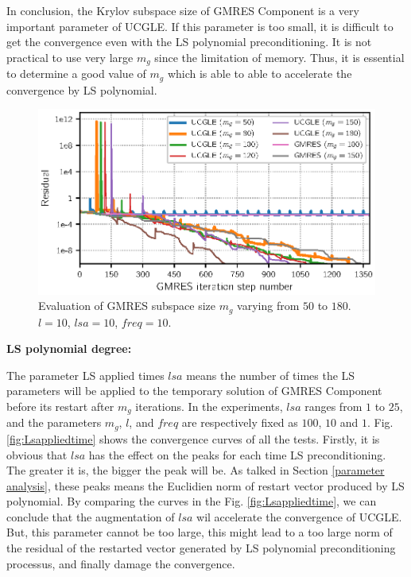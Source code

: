 In conclusion, the Krylov subspace size of GMRES Component is a very important parameter of UCGLE. If this parameter is too small, it is difficult to get the convergence even with the LS polynomial preconditioning. It is not practical to use very large $m_g$ since the limitation of memory. Thus, it is essential to determine a good value of $m_g$ which is able to able to accelerate the convergence by LS polynomial.

\begin{figure}[htbp]
	\centering
	\includegraphics[width=6.2in]{fig/conv_ksp_gmres.eps}
	\caption{Evaluation of GMRES subspace size $m_g$ varying from $50$ to $180$. $l=10$, $lsa=10$, $freq=10$.}
	\label{fig:krylovsubspace}
\end{figure}


\textbf{LS polynomial degree: }

The parameter LS applied times $lsa$ means the number of times the LS parameters will be applied to the temporary solution of GMRES Component before its restart after $m_g$ iterations. In the experiments, $lsa$ ranges from $1$ to $25$, and the parameters $m_g$, $l$, and $freq$ are respectively fixed as $100$, $10$ and $1$. Fig. \ref{fig:Lsappliedtime} shows the convergence curves of all the tests. Firstly, it is obvious that $lsa$ has the effect on the peaks for each time LS preconditioning. The greater it is, the bigger the peak will be. As talked in Section \ref{parameter analysis}, these peaks means the Euclidien norm of restart vector produced by LS polynomial. By comparing the curves in  the Fig. \ref{fig:Lsappliedtime}, we can conclude that the augmentation of $lsa$ wil accelerate the convergence of UCGLE. But, this parameter cannot be too large, this might lead to a too large norm of the residual of the restarted vector generated by LS polynomial preconditioning processus, and finally damage the convergence.

